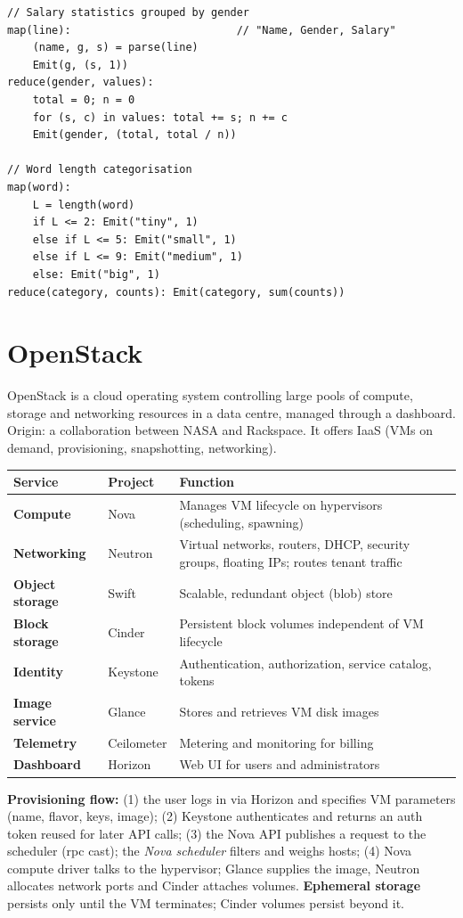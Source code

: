 \documentclass[11pt,a4paper,openany]{report}
\begin{document}
\begin{lstlisting}
// Salary statistics grouped by gender
map(line):                          // "Name, Gender, Salary"
    (name, g, s) = parse(line)
    Emit(g, (s, 1))
reduce(gender, values):
    total = 0; n = 0
    for (s, c) in values: total += s; n += c
    Emit(gender, (total, total / n))

// Word length categorisation
map(word):
    L = length(word)
    if L <= 2: Emit("tiny", 1)
    else if L <= 5: Emit("small", 1)
    else if L <= 9: Emit("medium", 1)
    else: Emit("big", 1)
reduce(category, counts): Emit(category, sum(counts))
\end{lstlisting}

\section{OpenStack}
OpenStack is a cloud operating system controlling large pools of compute, storage and networking resources in a data centre,
managed through a dashboard. Origin: a collaboration between NASA and Rackspace. It offers IaaS (VMs on demand, provisioning,
snapshotting, networking).

\begin{center}
\begin{tabularx}{\textwidth}{>{\bfseries}llX}
\toprule
Service & Project & Function\\
\midrule
Compute & Nova & Manages VM lifecycle on hypervisors (scheduling, spawning)\\
Networking & Neutron & Virtual networks, routers, DHCP, security groups, floating IPs; routes tenant traffic\\
Object storage & Swift & Scalable, redundant object (blob) store\\
Block storage & Cinder & Persistent block volumes independent of VM lifecycle\\
Identity & Keystone & Authentication, authorization, service catalog, tokens\\
Image service & Glance & Stores and retrieves VM disk images\\
Telemetry & Ceilometer & Metering and monitoring for billing\\
Dashboard & Horizon & Web UI for users and administrators\\
\bottomrule
\end{tabularx}
\end{center}

\textbf{Provisioning flow:} (1) the user logs in via Horizon and specifies VM parameters (name, flavor, keys, image); (2) Keystone
authenticates and returns an auth token reused for later API calls; (3) the Nova API publishes a request to the scheduler
(rpc cast); the \emph{Nova scheduler} filters and weighs hosts; (4) Nova compute driver talks to the hypervisor; Glance supplies the image,
Neutron allocates network ports and Cinder attaches volumes. \textbf{Ephemeral storage} persists only until the VM terminates; Cinder
volumes persist beyond it.
\end{document}
